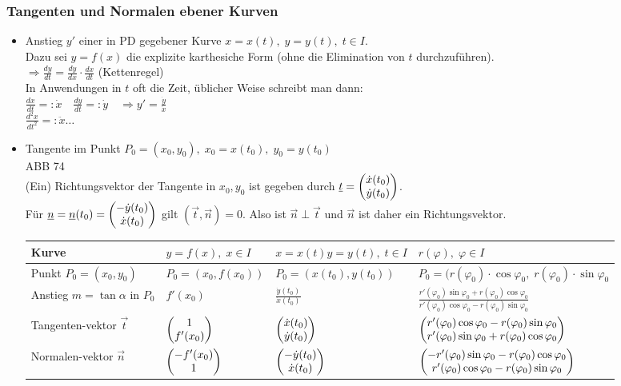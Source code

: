 \subsubsection{Tangenten und Normalen ebener Kurven}
\begin{itemize}
\item Anstieg $y'$ einer in PD gegebener Kurve $x=x(t), \; y=y(t), \; t\in I$.\\
Dazu sei $y=f(x)$ die explizite karthesiche Form (ohne die Elimination von $t$ durchzuführen).\\
$\Rightarrow \frac{dy}{dt}=\frac{dy}{dx}\cdot \frac{dx}{dt}$ (Kettenregel)\\
In Anwendungen in $t$ oft die Zeit, üblicher Weise schreibt man dann:\\
$\frac{dx}{dt}=:\dot{x} \quad \frac{dy}{dt}=:\dot{y} \quad \Rightarrow y'=\frac{\dot{y}}{\dot{x}}$\\
$\frac{d^2x}{dt^2}=:\ddot{x} \dots $
\item Tangente im Punkt $P_0=(x_0,y_0), \; x_0 = x(t_0), \; y_0=y(t_0)$\\
ABB 74\\
(Ein) Richtungsvektor der Tangente in $x_0, y_0$ ist gegeben durch $\underline{t}=\begin{pmatrix}\dot{x}(t_0)\\ \dot{y}(t_0)\end{pmatrix}$.\\
Für $\underline{n}=\underline{n}(t_0)=\begin{pmatrix}-\dot{y}(t_0)\\ \dot{x}(t_0)\end{pmatrix}$ gilt $(\vec{t}, \vec{n})=0$. Also ist $\vec{n}\perp \vec{t}$ und $\vec{n}$ ist daher ein Richtungsvektor.\\
\begin{tabular}{L{.18} | l | L{.18} | l}
Kurve & $y=f(x),\;x\in I$ & $x=x(t)$\newline $y=y(t), \; t\in I$ & $r(\varphi), \; \varphi \in I$ \\
\hline 
Punkt \newline$P_0=(x_0,y_0)$ & $P_0=(x_0,f(x_0))$ & $P_0=(x(t_0),y(t_0))$& $P_0=(r(\varphi_0)\cdot \cos\varphi_0 , \; r(\varphi_0) \cdot \sin \varphi_0$\\
Anstieg $m=\tan\alpha$ in $P_0$ & $f'(x_0)$ & $\frac{\dot{y}(t_0)}{\dot{x}(t_0)}$ & $\frac{r'(\varphi_0)\sin\varphi_0 + r(\varphi_0)\cos \varphi_0}{r'(\varphi_0)\cos\varphi_0 - r(\varphi_0)\sin \varphi_0}$\\
Tangenten-\newline vektor $\vec{t}$ & $\begin{pmatrix}1\\ f'(x_0)\end{pmatrix}$ & $\begin{pmatrix}\dot{x}(t_0) \\ \dot{y}(t_0)\end{pmatrix}$ & $\begin{pmatrix}r'(\varphi_0)\cos\varphi_0 - r(\varphi_0)\sin \varphi_0\\r'(\varphi_0)\sin\varphi_0 + r(\varphi_0)\cos \varphi_0\end{pmatrix}$\\
Normalen-\newline vektor $\vec{n}$ & $\begin{pmatrix}-f'(x_0) \\ 1\end{pmatrix}$ & $\begin{pmatrix}-\dot{y}(t_0)\\\dot{x}(t_0)\end{pmatrix}$ & $\begin{pmatrix}-r'(\varphi_0)\sin\varphi_0 - r(\varphi_0)\cos \varphi_0\\ r'(\varphi_0)\cos\varphi_0 - r(\varphi_0)\sin \varphi_0\end{pmatrix}$ \\
\end{tabular}
\end{itemize}
